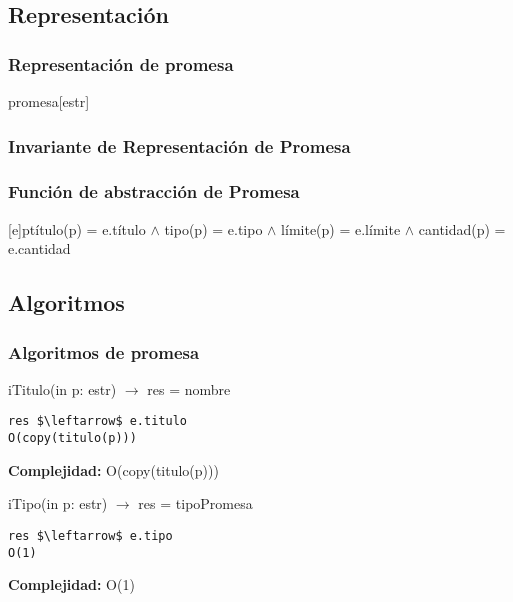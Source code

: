 \subsection{Representaci\'on}
\subsubsection{Representaci\'on de promesa}
\begin{Estructura}{promesa}[estr]
    \begin{Tupla}[estr]
    \end{Tupla}
\end{Estructura}

 \subsubsection{Invariante de Representaci\'on de Promesa}


\subsubsection{Funci\'on de abstracci\'on de Promesa}

[e]{p}{t\'itulo(p) = e.t\'itulo $\land$ tipo(p) = e.tipo $\land$ l\'imite(p) = e.l\'imite $\land$ cantidad(p) = e.cantidad}

  \subsection{Algoritmos}
\subsubsection{Algoritmos de promesa}

iTitulo(in p: estr) $\rightarrow$ res = nombre
\begin{lstlisting}[mathescape]
 res $\leftarrow$ e.titulo                                                         O(copy(titulo(p)))
\end{lstlisting}
\textbf{Complejidad:} O(copy(titulo(p)))

iTipo(in p: estr) $\rightarrow$ res = tipoPromesa
\begin{lstlisting}[mathescape]
 res $\leftarrow$ e.tipo                                                                  O(1)
\end{lstlisting}
\textbf{Complejidad:} O(1)

